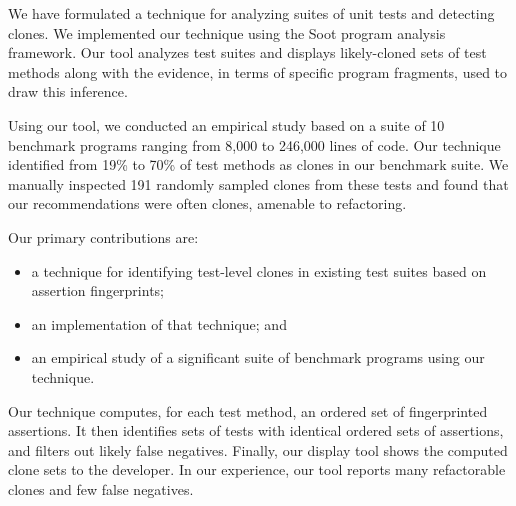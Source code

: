\documentclass[10pt]{article}
\begin{document}
We have formulated a technique for analyzing suites of unit tests and
detecting clones. We implemented our technique using the Soot program
analysis framework. Our tool analyzes test
suites and displays likely-cloned sets of test methods along with the
evidence, in terms of specific program fragments, used to draw this
inference.

Using our tool, we conducted an empirical study based on a suite of 10
benchmark programs ranging from 8,000 to 246,000 lines of code. Our
technique identified from 19\% to 70\% of test methods as clones in
our benchmark suite.  We manually inspected 191 randomly sampled clones
from these tests and found that our recommendations were 
often clones, amenable to refactoring.

Our primary contributions are:
\begin{itemize}
\item a technique for identifying test-level clones in existing
test suites based on assertion fingerprints;
\item an implementation of that technique; and
\item an empirical study of a significant suite of benchmark programs using our technique.
\end{itemize}
Our technique computes, for each test method, an ordered set of fingerprinted
assertions. It then identifies sets of tests with identical ordered sets of
assertions, and filters out likely false negatives. Finally, our display
tool shows the computed clone sets to the developer. In our experience,
our tool reports many refactorable clones and few false negatives.

\newpage


\end{document}
